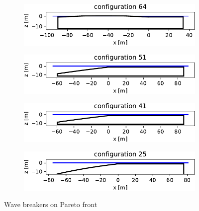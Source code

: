 \begin{figure}[h]
    \centering
    \begin{subfigure}[b]{0.49\textwidth}
        \centering
        \includegraphics[width=\linewidth]{figures/ComFLOW/Breakwater Geometries/Design Iteration 2 captive/breakwater_geometry64.pdf}    
        \caption[]%
        {{\small }}    
        \label{}
    \end{subfigure}
    \hfill
    \begin{subfigure}[b]{0.49\textwidth}  
        \centering 
        \includegraphics[width=\linewidth]{figures/ComFLOW/Breakwater Geometries/Design Iteration 2 captive/breakwater_geometry51.pdf}    
        \caption[]%
        {{\small }}    
        \label{}
    \end{subfigure}
    
    \centering
    \begin{subfigure}[b]{0.49\textwidth}
        \centering
        \includegraphics[width=\linewidth]{figures/ComFLOW/Breakwater Geometries/Design Iteration 2 captive/breakwater_geometry41.pdf}    
        \caption[]%
        {{\small }}    
        \label{}
    \end{subfigure}
    \hfill
    \begin{subfigure}[b]{0.49\textwidth}  
        \centering 
        \includegraphics[width=\linewidth]{figures/ComFLOW/Breakwater Geometries/Design Iteration 2 captive/breakwater_geometry25.pdf}    
        \caption[]%
        {{\small }}    
        \label{}
    \end{subfigure}
    
    \caption{Wave breakers on Pareto front}
    \label{fig: pareto front bw DI2 H3 captive}
\end{figure}





